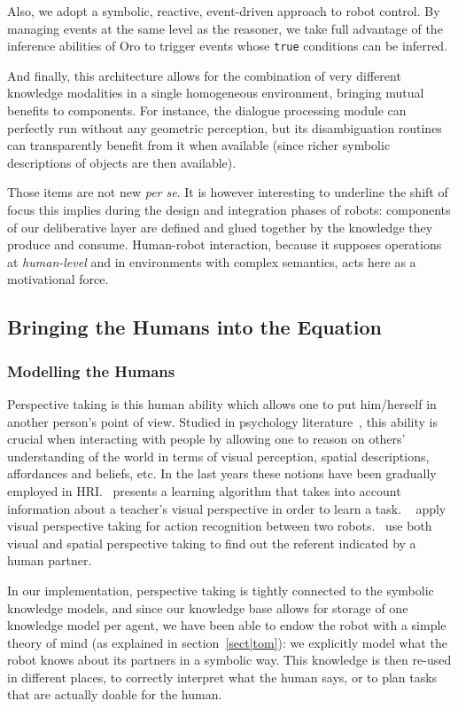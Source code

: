 \documentclass[preprint,3p,times]{elsarticle}
\begin{document}
Also, we adopt a symbolic, reactive, event-driven approach to robot control. By
managing events at the same level as the reasoner, we take full advantage of the
inference abilities of {\sc Oro} to trigger events whose \texttt{true}
conditions can be inferred.

And finally, this architecture allows for the combination of very different
knowledge modalities in a single homogeneous environment, bringing mutual
benefits to components. For instance, the dialogue processing module can
perfectly run without any geometric perception, but its disambiguation routines
can transparently benefit from it when available (since richer symbolic
descriptions of objects are then available).

Those items are not new \emph{per se}. It is however interesting to underline
the shift of focus this implies during the design and integration phases of
robots: components of our deliberative layer are defined and glued together by
the knowledge they produce and consume. Human-robot interaction, because it
supposes operations at \emph{human-level} and in environments with complex
semantics, acts here as a motivational force.


\subsection{Bringing the Humans into the Equation}

\subsubsection{Modelling the Humans}

Perspective taking is this human ability which allows one to put him/herself in
another person's point of view. Studied in psychology
literature~\cite{Flavell1992,Tversky1999}, this ability is crucial when
interacting with people by allowing one to reason on others' understanding of
the world in terms of visual perception, spatial descriptions, affordances and
beliefs, etc.  In the last years these notions have been gradually employed in
HRI.~\cite{Breazeal2006} presents a learning algorithm that takes into account
information about a teacher's visual perspective in order to learn a task.
~\cite{Johnson2005} apply visual perspective taking for action recognition
between two robots.~\cite{Trafton2005} use both visual and spatial perspective
taking to find out the referent indicated by a human partner.

In our implementation, perspective taking is tightly connected to the symbolic
knowledge models, and since our knowledge base allows for storage of one
knowledge model per agent, we have been able to endow the robot with a simple
theory of mind (as explained in section~\ref{sect|tom}): we explicitly model
what the robot knows about its partners in a symbolic way. This knowledge is
then re-used in different places, to correctly interpret what the human says,
or to plan tasks that are actually doable for the human.
\end{document}
